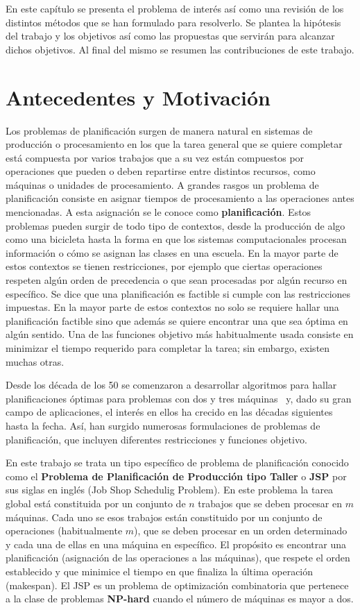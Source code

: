 En este capítulo se presenta el problema de interés así como una revisión de los distintos métodos que se han formulado para resolverlo. 
%
Se plantea la hipótesis del trabajo y los objetivos así como las propuestas que servirán para alcanzar dichos objetivos. 
%
Al final del mismo se resumen las contribuciones de este trabajo.

\section{Antecedentes y Motivación}
Los problemas de planificación surgen de manera natural en sistemas de producción o procesamiento en los que la tarea general que se 
quiere completar está compuesta por varios trabajos que a su vez están compuestos por operaciones que pueden o deben repartirse entre distintos recursos, como máquinas o unidades de procesamiento. 
%
A grandes rasgos un problema de planificación consiste en asignar tiempos de procesamiento a las operaciones antes mencionadas. A esta asignación se le conoce como \textbf{planificación}.
%
Estos problemas pueden surgir de todo tipo de contextos, desde la producción de algo como una bicicleta hasta la forma en que los sistemas computacionales 
procesan información o cómo se asignan las clases en una escuela. 
%
En la mayor parte de estos contextos se tienen restricciones, por ejemplo que ciertas operaciones respeten algún orden de precedencia o que sean procesadas por algún recurso en específico. Se dice que una planificación es factible si cumple con las restricciones impuestas.
%
En la mayor parte de estos contextos no solo se requiere hallar una planificación factible sino que además se quiere 
encontrar una que sea óptima en algún sentido.
%
Una de las funciones objetivo más habitualmente usada consiste en minimizar el tiempo requerido para completar la tarea; sin embargo, existen muchas otras.

Desde los década de los 50 se comenzaron a desarrollar algoritmos para hallar planificaciones óptimas para problemas con dos y tres máquinas~\cite{johnson1954optimal}
y, dado su gran campo de aplicaciones, el interés en ellos ha crecido en las décadas siguientes hasta la fecha.
%
Así, han surgido numerosas formulaciones de problemas de planificación, que incluyen diferentes restricciones y funciones objetivo.
 
En este trabajo se trata un tipo específico de problema de planificación conocido como el \textbf{Problema de Planificación de Producción tipo Taller} o \textbf{JSP} por sus 
siglas en inglés (Job Shop Schedulig Problem). 
%
En este problema la tarea global está constituida por un conjunto de $n$ trabajos que se deben procesar en $m$ máquinas. 
%
Cada uno se esos trabajos están constituido por un conjunto de operaciones (habitualmente $m$), que se deben procesar en un orden determinado y cada una de ellas
en una máquina en específico.
%
El propósito es encontrar una planificación (asignación de las operaciones a las máquinas), que respete el orden establecido y que minimice el tiempo en que finaliza
la última operación (makespan).
%
El JSP es un problema de optimización combinatoria que pertenece a la clase de problemas \textbf{NP-hard} cuando el número de máquinas es mayor a dos\cite{garey1976complexity}.


